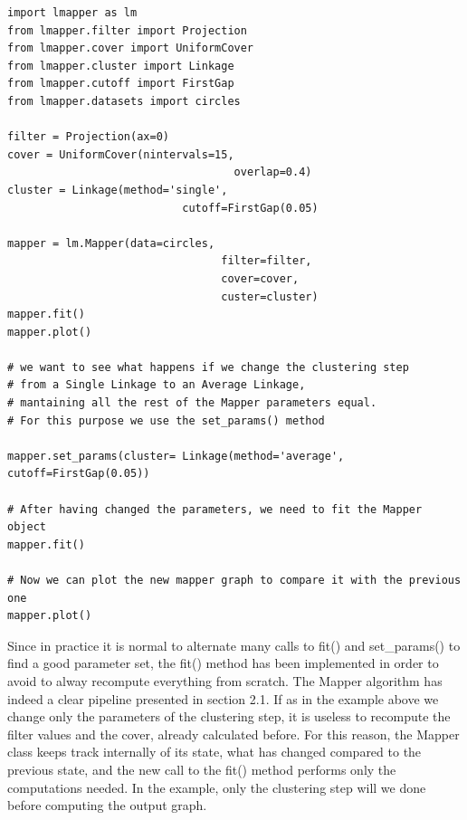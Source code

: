 \begin{lstlisting}[style=mystyle, deletekeywords={filter}]
import lmapper as lm
from lmapper.filter import Projection
from lmapper.cover import UniformCover
from lmapper.cluster import Linkage
from lmapper.cutoff import FirstGap
from lmapper.datasets import circles

filter = Projection(ax=0)
cover = UniformCover(nintervals=15,
								   overlap=0.4)
cluster = Linkage(method='single',
						   cutoff=FirstGap(0.05)

mapper = lm.Mapper(data=circles,
								 filter=filter,
								 cover=cover,
								 custer=cluster)
mapper.fit()
mapper.plot()

# we want to see what happens if we change the clustering step
# from a Single Linkage to an Average Linkage,
# mantaining all the rest of the Mapper parameters equal. 
# For this purpose we use the set_params() method

mapper.set_params(cluster= Linkage(method='average', cutoff=FirstGap(0.05))

# After having changed the parameters, we need to fit the Mapper object
mapper.fit()

# Now we can plot the new mapper graph to compare it with the previous one
mapper.plot()
\end{lstlisting}

Since in practice it is normal to alternate many calls to fit() and set\_params() to find a good parameter set, the fit() method has been implemented in order to avoid to alway recompute everything from scratch. The Mapper algorithm has indeed a clear pipeline presented in section 2.1. If as in the example above we change only the parameters of the clustering step, it is useless to recompute the filter values and the cover, already calculated before. For this reason, the Mapper class keeps track internally of its state, what has changed compared to the previous state, and the new call to the fit() method performs only the computations needed. In the example, only the clustering step will we done before computing the output graph.
